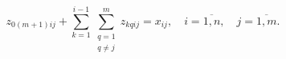 \begin{equation}
  \label{eq:part3_z_ijkq_2_2}
    z_{0(m+1)ij} +  \sum\limits_{k=1}^{i-1} \sum\limits_{\substack{q = 1 \\ q \neq j}}^m z_{kqij}= x_{ij},  \quad i = \overline{1, n}, \quad j = \overline{1, m}.
\end{equation}












